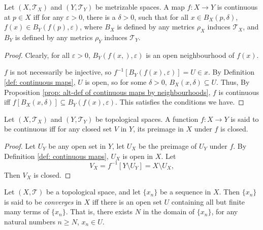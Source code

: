 \begin{proposition}
	Let $(X, \mathcal T_X)$ and $(Y, \mathcal T_{Y})$ be metrizable spaces. A map $f: X \to Y$ is continuous at $p \in X$ iff for any $\varepsilon > 0$, there is a $\delta > 0$, such that for all $x \in B_X(p, \delta)$, $f(x) \in B_Y(f(p), \varepsilon)$, where $B_X$ is defined by any metrics $\rho_X$ induces $\mathcal T_X$, and $B_Y$ is defined by any metrics $\rho_Y$ induces $\mathcal T_Y$.
	
	\begin{proof}
		Clearly, for all $\varepsilon > 0$, $B_Y(f(x,), \varepsilon)$ is an open neighbourhood of $f(x)$.
		
		$f$ is not necessarily be injective, so $f^{-1}[B_Y(f(x), \varepsilon)] = U \in x$. By Definition \ref{def: continuous maps}, $U$ is open, so for some $\delta > 0$, $B_X(x, \delta) \subseteq U$. Thus, By Proposition \ref{prop: alt-def of continuous maps by neighbourhoods}, $f$ is continuous iff $f[B_X(x, \delta)] \subseteq B_Y(f(x), \varepsilon)$. This satisfies the conditions we have.
	\end{proof}
\end{proposition}


\begin{proposition}
	Let $(X, \mathcal T_X)$ and $(Y, \mathcal T_Y)$ be topological spaces. A function $f: X \to Y$ is said to be continuous iff for any closed set $V$ in $Y$, its preimage in $X$ under $f$ is closed.
	
	\begin{proof}
		Let $U_Y$ be any open set in $Y$, let $U_X$ be the preimage of $U_Y$ under $f$. By Definition \ref{def: continuous maps}, $U_X$ is open in $X$. Let
		$$
		V_X = f^{-1}[Y \setminus U_Y] = X \setminus U_X,
		$$
		Then $V_X$ is closed.
	\end{proof}
\end{proposition}


\begin{definition}
	\label{def: convergence of sequences}
	Let $(X, \mathcal T)$ be a topological space, and let $\{x_n\}$ be a sequence in $X$. Then $\{x_n\}$ is said to be \textit{converges} in $X$ iff there is an open set $U$ containing all but finite many terms of $\{x_n\}$. That is, there exists $N$ in the domain of $\{x_n\}$, for any natural numbers $n \ge N$, $x_n \in U$.
\end{definition}


